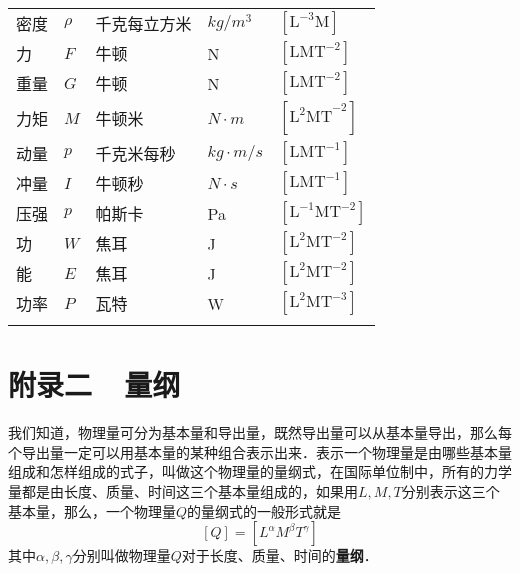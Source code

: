 \begin{table}
\begin{tabularx}{\textwidth}{MM|MM|M}
        密度                      & $\rho$                   & 千克每立方米             & $\unit{kg/m^{3}}$    & $[\mathrm{L}^{-3}\mathrm{M}]$       \\
        力                       & $F$                      & 牛顿                 & \unit{N}             & $[\mathrm{LMT}^{-2}]$               \\
        重量                      & $G$                      & 牛顿                 & \unit{N}             & $[\mathrm{LMT}^{-2}]$               \\
        力矩                      & $M$                      & 牛顿米                & $\unit{N\cdot m}$    & $[\mathrm{L^2MT}^{-2}]$             \\
        动量                      & $p$                      & 千克米每秒              & $\unit{kg\cdot m/s}$ & $[\mathrm{LMT}^{-1}]$               \\
        冲量                      & $I$                      & 牛顿秒                & $\unit{N\cdot s}$    & $[\mathrm{LMT}^{-1}]$               \\
        压强                      & $p$                      & 帕斯卡                & \unit{Pa}            & $[\mathrm{L}^{-1}\mathrm{MT}^{-2}]$ \\
        功                       & $W$                      & 焦耳                 & \unit{J}             & $[\mathrm{L}^{2}\mathrm{MT}^{-2}]$  \\
        能                       & $E$                      & 焦耳                 & \unit{J}             & $[\mathrm{L}^{2}\mathrm{MT}^{-2}]$  \\
        功率                      & $P$                      & 瓦特                 & \unit{W}             & $[\mathrm{L}^{2}\mathrm{MT}^{-3}]$  \\
        \Xhline{1.5pt}
    \end{tabularx}
\end{table}





\chapter{附录二~~量纲}

我们知道，物理量可分为基本量和导出量，既然导出量可以从基本量导出，那么每个导出量一定可以用基本量的某种组合表示出来．表示一个物理量是由哪些基本量组成和怎样组成的式子，叫做这个物理量的量纲式，在国际单位制中，所有的力学量都是由长度、质量、时间这三个基本量组成的，如果用$L,M,T$分别表示这三个基本量，那么，一个物理量$Q$的量纲式的一般形式就是
\[[Q]=\si{[L^{\alpha}M^{\beta}T^{\gamma}]}\]
其中$\alpha, \beta, \gamma$分别叫做物理量$Q$对于长度、质量、时间的\textbf{量纲}．

